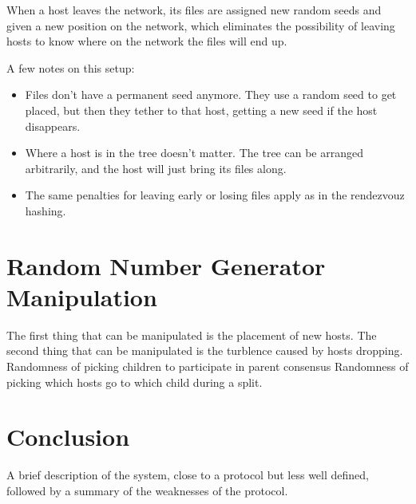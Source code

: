 \documentclass[twocolumn]{article}
\begin{document}
When a host leaves the network, its files are assigned new random seeds and given a new position on the network, which eliminates the possibility of leaving hosts to know where on the network the files will end up.

A few notes on this setup:
\begin{itemize}
	\item Files don't have a permanent seed anymore. They use a random seed to get placed, but then they tether to that host, getting a new seed if the host disappears.
	\item Where a host is in the tree doesn't matter. The tree can be arranged arbitrarily, and the host will just bring its files along.
	\item The same penalties for leaving early or losing files apply as in the rendezvouz hashing.
\end{itemize}

\section{Random Number Generator Manipulation}
The first thing that can be manipulated is the placement of new hosts.
The second thing that can be manipulated is the turblence caused by hosts dropping.
Randomness of picking children to participate in parent consensus
Randomness of picking which hosts go to which child during a split.

\section{Conclusion}
A brief description of the system, close to a protocol but less well defined, followed by a summary of the weaknesses of the protocol.
\end{document}
